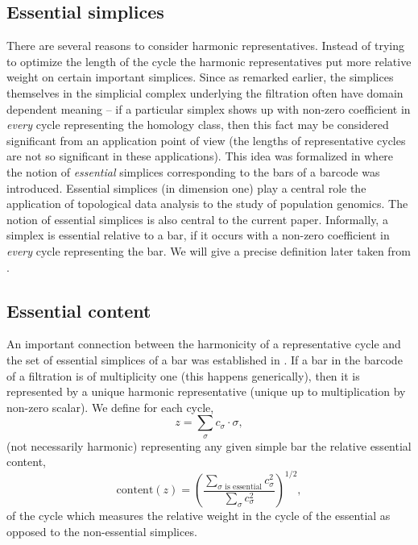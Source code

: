 \documentclass[11pt]{amsart}
\theoremstyle{theorem}
\theoremstyle{remark}
\theoremstyle{definition}
\newcommand{\econt}{\mathrm{content}}
\begin{document}
\subsection{Essential simplices}
There are several reasons to consider harmonic representatives.
Instead of trying to optimize the length of the cycle the harmonic representatives 
put more relative weight on certain important simplices.
Since as remarked earlier, the simplices themselves in the simplicial complex underlying the filtration often have
domain dependent meaning --  if a particular simplex shows up with non-zero coefficient in \emph{every} cycle representing the homology class, then this fact may be considered
significant from an application point of view
(the lengths of representative cycles are not so significant
in these applications).
This idea was formalized in \cite{essential} where the notion
of \emph{essential} simplices corresponding to the bars of a barcode was introduced. Essential simplices (in dimension one) 
play a central role the application of topological data analysis to the study of population genomics. 
The notion of essential simplices is also central to the current paper. 
Informally, a simplex is essential relative to a bar, if it occurs with a non-zero coefficient in \emph{every}  cycle representing the bar. We will give 
a precise definition later taken from \cite{Basu-Cox}.

\subsection{Essential content}
\label{subsec:essential}
An important connection between the harmonicity of a representative
cycle and the set of essential simplices of a bar was established in \cite{Basu-Cox}.
If a bar in the barcode of a filtration
is of multiplicity one (this happens generically), then it is represented by a unique harmonic 
representative (unique up to multiplication by non-zero scalar). 
We define for each cycle,  
\[
z = \sum_{\sigma} c_\sigma \cdot \sigma,
\]
(not necessarily harmonic) representing any given simple bar the relative
essential content,
\[
\econt(z) = \left(\frac{\sum_{\sigma \mbox{ is essential}}  c_\sigma^2}{\sum_{\sigma} c_\sigma^2}\right)^{1/2},
\]
of the cycle 
which measures the relative weight in the cycle of the essential as opposed to the 
non-essential simplices. 
\end{document}
